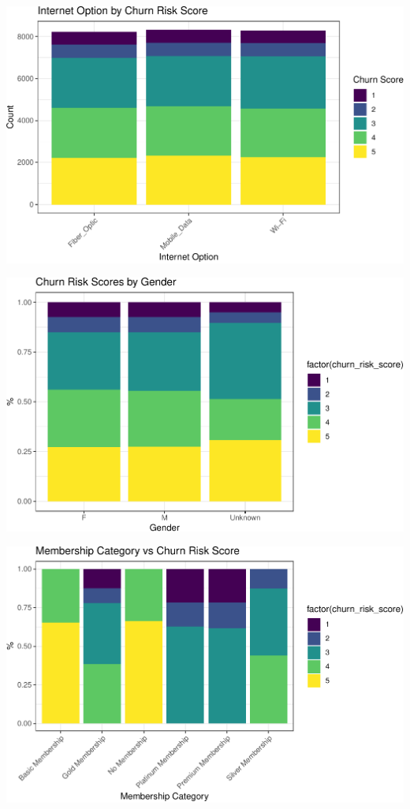 \documentclass[
  letterpaper,
  DIV=11,
  numbers=noendperiod]{scrartcl}
\begin{document}
\begin{center}
\includegraphics{FPCP4_files/figure-pdf/unnamed-chunk-17-1.pdf}
\end{center}

\begin{center}
\includegraphics{FPCP4_files/figure-pdf/unnamed-chunk-18-1.pdf}
\end{center}

\begin{center}
\includegraphics{FPCP4_files/figure-pdf/unnamed-chunk-19-1.pdf}
\end{center}
\end{document}
